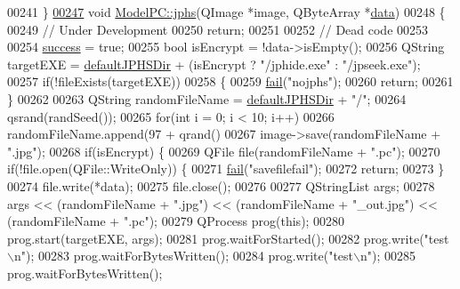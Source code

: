 \begin{DoxyCode}
00241 \}
\hypertarget{modelpc_8cpp_source_l00247}{}\hyperlink{class_model_p_c_a8bee0255c09449868c7e6097afaaf0cd}{00247} \textcolor{keywordtype}{void} \hyperlink{class_model_p_c_a8bee0255c09449868c7e6097afaaf0cd}{ModelPC::jphs}(QImage *image, QByteArray *\hyperlink{namespace_errors_dict_setup_adf4c30d205d29df7343e26f7c62b0685}{data})
00248 \{
00249     \textcolor{comment}{// Under Development}
00250     \textcolor{keywordflow}{return};
00251 
00252     \textcolor{comment}{// Dead code}
00253 
00254     \hyperlink{class_model_p_c_a945ffbbc44a832b953c191debd448f4c}{success} = \textcolor{keyword}{true};
00255     \textcolor{keywordtype}{bool} isEncrypt = !data->isEmpty();
00256     QString targetEXE = \hyperlink{class_model_p_c_abd038306f14f22fb885a1697c96d6335}{defaultJPHSDir} + (isEncrypt ? \textcolor{stringliteral}{"/jphide.exe"} : \textcolor{stringliteral}{"/jpseek.exe"});
00257     \textcolor{keywordflow}{if}(!fileExists(targetEXE))
00258     \{
00259         \hyperlink{class_model_p_c_a47464b59b7e37fcee25e55475708aabd}{fail}(\textcolor{stringliteral}{"nojphs"});
00260         \textcolor{keywordflow}{return};
00261     \}
00262 
00263     QString randomFileName = \hyperlink{class_model_p_c_abd038306f14f22fb885a1697c96d6335}{defaultJPHSDir} + \textcolor{stringliteral}{"/"};
00264     qsrand(randSeed());
00265     \textcolor{keywordflow}{for}(\textcolor{keywordtype}{int} i = 0; i < 10; i++)
00266         randomFileName.append(97 + qrand() %
00267     image->save(randomFileName + \textcolor{stringliteral}{".jpg"});
00268     \textcolor{keywordflow}{if}(isEncrypt) \{
00269         QFile file(randomFileName + \textcolor{stringliteral}{".pc"});
00270         \textcolor{keywordflow}{if}(!file.open(QFile::WriteOnly)) \{
00271             \hyperlink{class_model_p_c_a47464b59b7e37fcee25e55475708aabd}{fail}(\textcolor{stringliteral}{"savefilefail"});
00272             \textcolor{keywordflow}{return};
00273         \}
00274         file.write(*data);
00275         file.close();
00276 
00277         QStringList args;
00278         args << (randomFileName + \textcolor{stringliteral}{".jpg"}) << (randomFileName + \textcolor{stringliteral}{"\_out.jpg"}) << (randomFileName + \textcolor{stringliteral}{".pc"});
00279         QProcess prog(\textcolor{keyword}{this});
00280         prog.start(targetEXE, args);
00281         prog.waitForStarted();
00282         prog.write(\textcolor{stringliteral}{"test\(\backslash\)n"});
00283         prog.waitForBytesWritten();
00284         prog.write(\textcolor{stringliteral}{"test\(\backslash\)n"});
00285         prog.waitForBytesWritten();

\end{DoxyCode}
